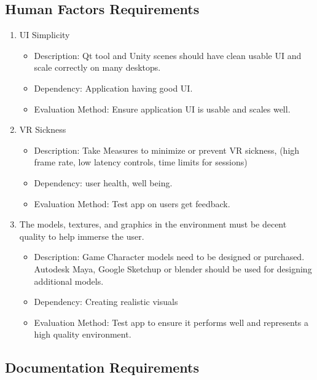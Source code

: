 \documentclass[a4paper,10pt]{article}
\begin{document}
	\subsection{Human Factors Requirements}
	\begin{enumerate}
	\item UI Simplicity
	    \begin{itemize}
	      \item Description: Qt tool and Unity scenes should have clean usable UI and scale correctly on many desktops.
	      \item Dependency:  Application having good UI.
	      \item Evaluation Method: Ensure application UI is usable and scales well.
	    \end{itemize}
	\item VR Sickness	 
	    \begin{itemize}
	      \item Description: Take Measures to minimize or prevent VR sickness, (high frame rate, low latency controls, time limits for sessions)
	      \item Dependency: user health, well being.
	      \item Evaluation Method: Test app on users get feedback.
	    \end{itemize}
	\item The models, textures, and graphics in the environment must be decent quality to help immerse the user.
	    \begin{itemize}	%
	      \item Description: Game Character models need to be designed or purchased. Autodesk Maya, Google Sketchup or blender should be used for designing additional models. 
	      \item Dependency: Creating realistic visuals 
	      \item Evaluation Method: Test app to ensure it performs well and represents a high quality environment.
	    \end{itemize}
	\end{enumerate}
	\subsection{Documentation Requirements}
\end{document}
